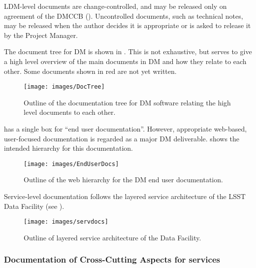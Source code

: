 LDM-level documents are change-controlled, and may be released only on agreement of the DMCCB (). Uncontrolled documents, such as technical notes, may be released when the author decides it is appropriate or is asked to release it by the Project Manager.

The document tree for DM is shown in . This is not exhaustive, but serves to give a high level overview of the main documents in DM and how they relate to each other. Some documents shown in red are not yet written.

\begin{figure}
\begin{center}
 \texttt{[image: images/DocTree]}
\caption{Outline of the documentation tree for DM software relating the high level documents to each other. \label{fig:doctree}}
\end{center}
\end{figure}

 has a single box for ``end user documentation''. However, appropriate web-based, user-focused documentation is regarded as a major DM deliverable.  shows the intended hierarchy for this documentation.

\begin{figure}
\begin{center}
 \texttt{[image: images/EndUserDocs]}
\caption{Outline of the web hierarchy for the DM end user documentation. \label{fig:eudoc}}
\end{center}
\end{figure}



Service-level documentation follows the layered service architecture of the LSST Data Facility (see ).

\begin{figure}
\begin{center}
 \texttt{[image: images/servdocs]}
\caption{Outline of layered service architecture of the Data Facility. \label{fig:servdoc}}
\end{center}
\end{figure}

\subsubsection {Documentation of Cross-Cutting Aspects for services}

